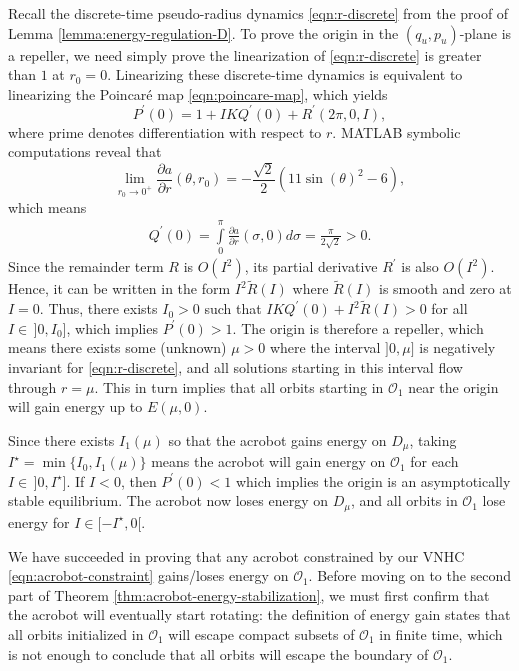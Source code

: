 \documentclass[journal,twoside,web, onecolumn, draftcls]{ieeecolor}
\newcommand*{\pdiff}[2]{\frac{\partial #1}{\partial #2}}
\begin{document}
Recall the discrete-time pseudo-radius dynamics \eqref{eqn:r-discrete} from the
proof of Lemma \ref{lemma:energy-regulation-D}. 
To prove the origin in the \((q_u,p_u)\)-plane is a repeller, we need simply
prove the linearization of \eqref{eqn:r-discrete} is greater than \(1\) at 
\(r_0 = 0\).
Linearizing these discrete-time dynamics is equivalent to linearizing the
Poincar\'{e} map \eqref{eqn:poincare-map}, which yields 
\[
    P^\prime(0) = 1 + I K Q^\prime(0) + R^\prime(2\pi,0,I)
    ,
\]
where prime denotes differentiation with respect to \(r\).
MATLAB symbolic computations reveal that
\begin{equation*}
    \lim \limits_{r_0 \to 0^+}
    \pdiff{a}{r}(\theta,r_0) 
    = -\frac{\sqrt{2}}{2} \left(11\sin(\theta)^2 - 6\right)
    ,
\end{equation*}
which means
\begin{align*}
    Q^\prime(0) = \int \limits_0^\pi \pdiff{a}{r}(\sigma,0) d\sigma
    = \frac{\pi}{2\sqrt{2}} > 0
    .
\end{align*}
Since the remainder term \(R\) is \(O(I^2)\), its partial derivative 
\(R^\prime\) is also \(O(I^2)\).
Hence, it can be written in the form
\(I^2 \tilde{R}(I)\) where \(\tilde{R}(I)\) is smooth and zero at \(I = 0\).
Thus, there exists \(I_0 > 0\) such that 
\(I K Q^\prime(0) + I^2 \tilde{R}(I) > 0\) for all \(I \in \, ]0,I_0]\),
which implies \(P^\prime(0) > 1\).
The origin is therefore a repeller, which means there exists some
(unknown) \(\mu > 0\) where the interval \(]0,\mu]\) is negatively
invariant for \eqref{eqn:r-discrete}, and all solutions starting in this
interval flow through \(r = \mu\).
This in turn implies that all orbits starting in \(\mathcal{O}_1\) near the
origin will gain energy up to \(E(\mu,0)\).

Since there exists \(I_1(\mu)\) so that the acrobot gains energy on \(D_\mu\),
taking \(I^\star = \min\{I_0,I_1(\mu)\}\) means the acrobot will gain energy on
\(\mathcal{O}_1\) for each \(I \in \, ]0,I^\star]\).
If \(I < 0\), then \(P^\prime(0) < 1\) which implies the origin is an
asymptotically stable equilibrium.
The acrobot now loses energy on \(D_\mu\), and all orbits in \(\mathcal{O}_1\)
lose energy for \(I \in [-I^\star,0[\).

We have succeeded in proving that any acrobot constrained by 
our VNHC \eqref{eqn:acrobot-constraint} gains/loses energy on \(\mathcal{O}_1\).
Before moving on to the second part of Theorem
\ref{thm:acrobot-energy-stabilization}, we must first confirm that the
acrobot will eventually start rotating:
the definition of energy gain states that all orbits initialized in
\(\mathcal{O}_1\) will escape compact subsets of \(\mathcal{O}_1\) in finite
time, which is not enough to conclude that all orbits will escape the boundary
of \(\mathcal{O}_1\). 
\end{document}
